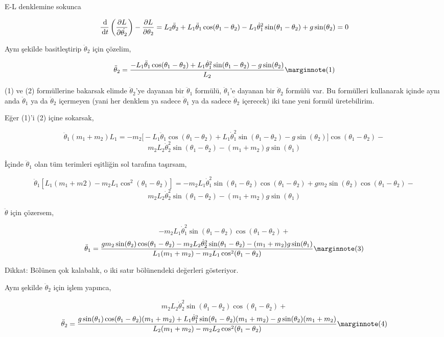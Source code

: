 \documentclass[12pt,fleqn]{article}\usepackage{../../common}
\begin{document}
E-L denklemine sokunca

$$
\frac{\,\mathrm{d}}{\,\mathrm{d} t} \left(
\frac{\partial L}{\partial \dot{\theta_2}} 
\right) - \frac{\partial L}{\partial \theta_2} =  
L_2 \ddot{\theta}_2 + L_1 \ddot{\theta}_1 \cos(\theta_1 - \theta_2) - 
L_1 \dot{\theta}_1^2 \sin(\theta_1 - \theta_2) + g \sin (\theta_2) = 0
$$

Aynı şekilde basitleştirip $\ddot{\theta}_2$ için çözelim,

$$
\ddot{\theta}_2 = 
\frac{
-L_1 \ddot{\theta}_1 \cos(\theta_1-\theta_2) + 
L_1 \dot{\theta}_1^2\sin(\theta_1-\theta_2) - 
g \sin(\theta_2)
}
{L_2}
\mlabel{1}
$$

(1) ve (2) formüllerine bakarsak elimde $\ddot{\theta}_2$'ye dayanan bir
$\ddot{\theta}_1$ formülü, $\ddot{\theta}_1$'e dayanan bir
$\ddot{\theta}_2$ formülü var. Bu formülleri kullanarak içinde aynı anda
$\ddot{\theta}_1$ ya da $\ddot{\theta}_2$ içermeyen (yani her denklem ya
sadece $\ddot{\theta}_1$ ya da sadece $\ddot{\theta}_2$ içerecek) iki tane
yeni formül üretebilirim.

Eğer (1)'i (2) içine sokarsak, 

$$
\ddot{\theta}_1 (m_1 + m_2) L_1 = -m_2 
\big[-L_1\ddot{\theta}_1 \cos(\theta_1-\theta_2) + 
 L_1\dot{\theta}_1^2 \sin(\theta_1-\theta_2) -
 g \sin(\theta_2) \big] \cos(\theta_1-\theta_2)- 
$$
$$
m_2 L_2 \dot{\theta}_2^2 \sin(\theta_1-\theta_2)- 
(m_1 + m_2) g \sin(\theta_1)
$$

İçinde $\ddot{\theta}_1$ olan tüm terimleri eşitliğin sol tarafına taşırsam,

$$
\ddot{\theta}_1 [L_1 (m_1 + m2) - m_2 L_1 \cos^2(\theta_1-\theta_2)] =
-m_2 L_1 \dot{\theta}_1^2 \sin(\theta_1-\theta_2) \cos(\theta_1-\theta_2) + 
g m_2 \sin(\theta_2) \cos(\theta_1-\theta_2) - 
$$
$$
m_2 L_2 \dot{\theta}_2^2 \sin(\theta_1-\theta_2) - 
(m_1 + m_2) g \sin(\theta_1)
$$

$\ddot{\theta}$ için çözersem, 

$$
 -m_2 L_1 \dot{\theta}_1^2 \sin(\theta_1-\theta_2)\cos(\theta_1-\theta_2) + 
$$
$$
\ddot{\theta}_1 = 
\frac{ g m_2 \sin(\theta_2)\cos(\theta_1-\theta_2) -
m_2 L_2 \dot{\theta}_2^2 \sin(\theta_1-\theta_2) - (m_1+m_2)g\sin(\theta_1)
}
{L_1 (m_1+m_2)-m_2L_1\cos^2(\theta_1-\theta_2)}
\mlabel{3}
$$

Dikkat: Bölünen çok kalabalık, o iki satır bölünendeki değerleri
gösteriyor. 

Aynı şekilde $\ddot{\theta}_2$ için işlem yapınca, 

$$
m_2 L_2 \dot{\theta}_2^2 \sin(\theta_1-\theta_2)\cos(\theta_1-\theta_2) + 
$$
$$
\ddot{\theta}_2 = 
\frac{ 
g \sin(\theta_1) \cos(\theta_1-\theta_2)(m_1+m_2) + 
L_1 \dot{\theta}_1^2 \sin(\theta_1-\theta_2)(m_1+m_2) - g\sin(\theta_2) (m_1+m_2)
}
{L_2 (m_1+m_2) - m_2 L_2 \cos^2 (\theta_1-\theta_2)}
\mlabel{4}
$$
\end{document}
